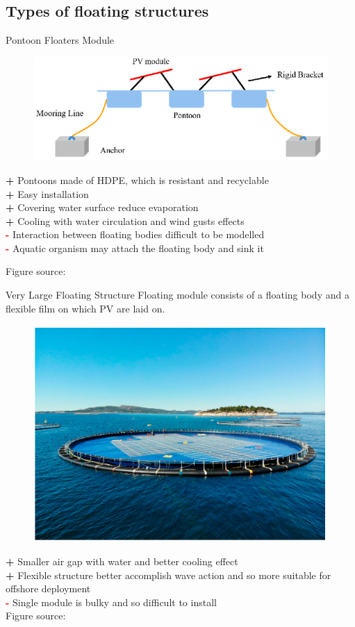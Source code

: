 \documentclass[aspectratio=169, 12pt]{beamer}
\begin{document}
\subsection{Types of floating structures}
\begin{frame}{Pontoon Floaters Module}{\insertsubsection}
  \begin{figure}
    \centering
    \includegraphics[width=0.4\columnwidth]{figure/pontoon.png}
  \end{figure}
  
  \textcolor{NTNUgreen}{\textbf{+}} Pontoons made of HDPE, which is resistant and recyclable\\
  \textcolor{NTNUgreen}{\textbf{+}} Easy installation\\
  \textcolor{NTNUgreen}{\textbf{+}} Covering water surface reduce evaporation\\
  \textcolor{NTNUgreen}{\textbf{+}} Cooling with water circulation and wind gusts effects\\
  \textcolor{red}{\textbf{-}} Interaction between floating bodies difficult to be modelled\\
  \textcolor{red}{\textbf{-}} Aquatic organism may attach the floating body and sink it

  {\tiny Figure source: \cite{jmse11112064}}
\end{frame}

\begin{frame}{Very Large Floating Structure}{\insertsubsection}
  Floating module consists of a floating body and a flexible film on which PV are laid on.
  \begin{figure}
    \centering
    \includegraphics[width=0.3\columnwidth]{figure/vlfs.png}
  \end{figure}

  \textcolor{NTNUgreen}{\textbf{+}} Smaller air gap with water and better cooling effect\\
  \textcolor{NTNUgreen}{\textbf{+}} Flexible structure better accomplish wave action and so more suitable for offshore deployment\\
  \textcolor{red}{\textbf{-}} Single module is bulky and so difficult to install\\

  {\tiny Figure source: \cite{jmse11112064}}
\end{frame}
\end{document}
